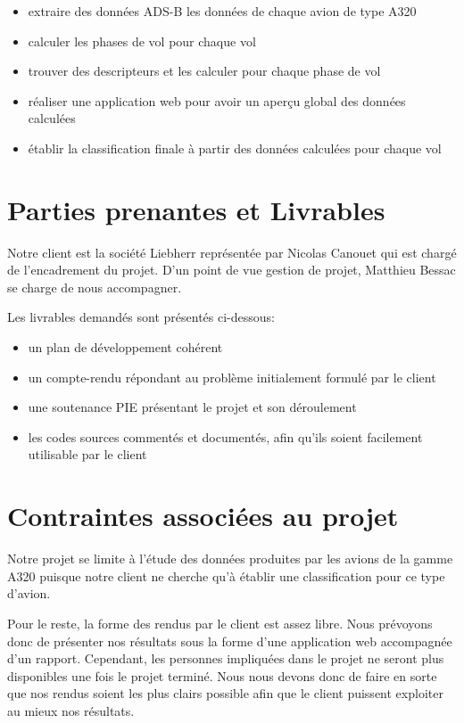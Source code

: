 \begin{itemize}
	\item extraire des données ADS-B les données de chaque avion de type A320
	\item calculer les phases de vol pour chaque vol
	\item trouver des descripteurs et les calculer pour chaque phase de vol
	\item réaliser une application web pour avoir un aperçu global des données calculées
	\item établir la classification finale à partir des données calculées pour chaque vol
\end{itemize}

\section*{Parties prenantes et Livrables}
Notre client est la société Liebherr représentée par Nicolas Canouet qui est chargé de l'encadrement du projet. D'un point de vue gestion de projet, Matthieu Bessac se charge de nous accompagner.

Les livrables demandés sont présentés ci-dessous:
\begin{itemize}
	\item un plan de développement cohérent
	\item un compte-rendu répondant au problème initialement formulé par le client
	\item une soutenance PIE présentant le projet et son déroulement
	\item les codes sources commentés et documentés, afin qu'ils soient facilement utilisable par le client
\end{itemize}



\section*{Contraintes associées au projet}
Notre projet se limite à l'étude des données produites par les avions de la gamme A320 puisque notre client ne cherche qu'à établir une classification pour ce type d'avion.

Pour le reste, la forme des rendus par le client est assez libre. Nous prévoyons donc de présenter nos résultats sous la forme d'une application web accompagnée d'un rapport. Cependant, les personnes impliquées dans le projet ne seront plus disponibles une fois le projet terminé. Nous nous devons donc de faire en sorte que nos rendus soient les plus clairs possible afin que le client puissent exploiter au mieux nos résultats.

